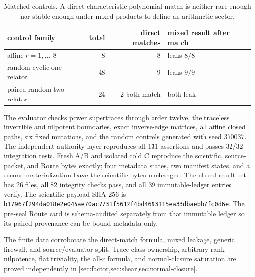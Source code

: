 \begin{table}[H]
\centering
\small
\begin{tabular}{@{}L{0.38\textwidth}rrL{0.25\textwidth}@{}}
\toprule
control family & total & direct matches & mixed result after match \\
\midrule
affine $r=1,\ldots,8$ & 8 & 8 & leaks $8/8$ \\
random cyclic one-relator & 48 & 9 & leaks $9/9$ \\
paired random two-relator & 24 & 2 both-match & both leak \\
\bottomrule
\end{tabular}
\caption{Matched controls.  A direct characteristic-polynomial match is
neither rare enough nor stable enough under mixed products to define an
arithmetic sector.}
\label{tab:generic-audit}
\end{table}

The evaluator checks power supertraces through order twelve, the traceless
invertible and nilpotent boundaries, exact inverse-edge matrices, all affine
closed paths, six fixed mutations, and the random controls generated with
seed $370037$.  The independent authority layer reproduces all 131 assertions
and passes 32/32 integration tests.  Fresh A/B and isolated cold C reproduce
the scientific, source-packet, and Route bytes exactly; four metadata states,
two manifest states, and a second materialization leave the scientific bytes
unchanged.  The closed result set has 26 files, all 82 integrity checks pass,
and all 39 immutable-ledger entries verify.  The scientific payload SHA-256 is
\nolinkurl{b17967f294da018e2e045ae70ac7731f5612f4bd4693115ea33dbaebb7fc0d6e}.
The pre-seal Route card is schema-audited separately from that immutable
ledger so its paired provenance can be bound metadata-only.

The finite data corroborate the direct-match formula, mixed leakage, generic
firewall, and source/evaluator split.  Trace-class ownership, arbitrary-rank
nilpotence, flat triviality, the all-$r$ formula, and normal-closure saturation
are proved independently in \cref{sec:factor,sec:shear,sec:normal-closure}.
